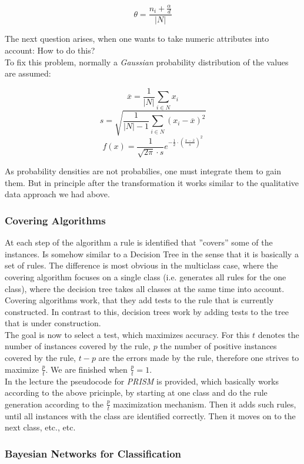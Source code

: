 \documentclass[12pt,a4paper]{article}
\begin{document}
\[\theta = \frac{n_i + \frac{\alpha}{d}}{|N|}\]


\noindent The next question arises, when one wants to take numeric attributes into account: How to do this?\\
To fix this problem, normally a \textit{Gaussian} probability distribution of the values are assumed:

\[\overline{x} = \frac{1}{|N|} \sum_{i \in N} x_i\]
\[s = \sqrt{\frac{1}{|N|-1} \sum_{i \in N} (x_i - \overline{x})^2}\]
\[f(x) = \frac{1}{\sqrt{2 \pi} \cdot s} e^{-\frac{1}{2} \cdot \left( \frac{x - \overline{x}}{s} \right)^2}\]

\noindent As probability densities are not probabilies, one must integrate them to gain them. But in principle after the transformation it works similar to the qualitative data approach we had above.

\subsubsection{Covering Algorithms}

\noindent At each step of the algorithm a rule is identified that ''covers'' some of the instances. Is somehow similar to a Decision Tree in the sense that it is basically a set of rules. The difference is most obvious in the multiclass case, where the covering algorithm focuses on a single class (i.e. generates all rules for the one class), where the decision tree takes all classes at the same time into account.\\
Covering algorithms work, that they add tests to the rule that is currently constructed. In contrast to this, decision trees work by adding tests to the tree that is under construction.\\
The goal is now to select a test, which maximizes accuracy. For this \(t\) denotes the number of instances covered by the rule, \(p\) the number of positive instances covered by the rule, \(t-p\) are the errors made by the rule, therefore one strives to maximize \(\frac{p}{t}\). We are finished when \(\frac{p}{t} = 1\).\\
In the lecture the pseudocode for \textit{PRISM} is provided, which basically works according to the above pricinple, by starting at one class and do the rule generation according to the \(\frac{p}{t}\) maximization mechanism. Then it adds such rules, until all instances with the class are identified correctly. Then it moves on to the next class, etc., etc.

\subsubsection{Bayesian Networks for Classification}
\end{document}
